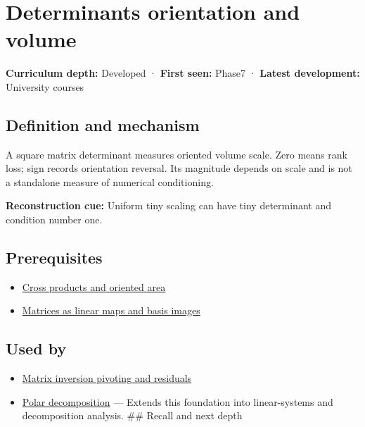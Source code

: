 \hypertarget{appendix-da478be01d02}{}\label{referencestart:appendix-da478be01d02}
\section{Determinants orientation and volume}\label{appendix-da478be01d02-determinants-orientation-and-volume}

\textbf{Curriculum depth:} Developed · \textbf{First seen:} Phase7 · \textbf{Latest development:} University courses

\subsection{Definition and mechanism}\label{appendix-da478be01d02-definition-and-mechanism}

A square matrix determinant measures oriented volume scale. Zero means rank loss; sign records orientation reversal. Its magnitude depends on scale and is not a standalone measure of numerical conditioning.

\textbf{Reconstruction cue:} Uniform tiny scaling can have tiny determinant and condition number one.

\subsection{Prerequisites}\label{appendix-da478be01d02-prerequisites}

\begin{itemize}
\tightlist
\item
  \hyperref[appendix-2391db8052b1]{Cross products and oriented area}
\item
  \hyperref[appendix-bd39c3bf5d64]{Matrices as linear maps and basis images}
\end{itemize}

\subsection{Used by}\label{appendix-da478be01d02-used-by}

\begin{itemize}
\tightlist
\item
  \hyperref[appendix-48d2e66378ab]{Matrix inversion pivoting and residuals}
\item
  \hyperref[appendix-73f5bcf7a462]{Polar decomposition} --- Extends this foundation into linear-systems and decomposition analysis. \#\# Recall and next depth
\end{itemize}

